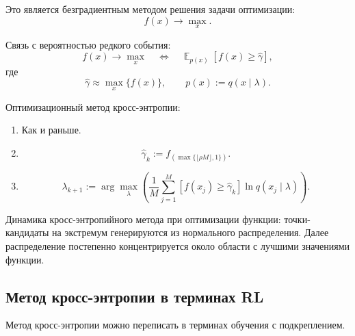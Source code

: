 \documentclass[12pt,a4paper]{article}
\DeclareMathOperator{\E}{\mathbb E}
\begin{document}
Это является безградиентным методом решения задачи оптимизации:
\[
f(x) \to \max_x.
\]

Связь с вероятностью редкого события:
\[
f(x) \to \max_x
\quad
\Longleftrightarrow
\quad
\E_{p(x)}
\left[
f(x) \ge \hat\gamma
\right],
\]
где
\[
\hat\gamma \approx \max_x \{f(x)\},
\qquad
p(x) := q(x \mid \lambda).
\]

Оптимизационный метод кросс-энтропии:

\begin{enumerate}
    \item[1)--3)] Как и раньше.

    \item[4)]
    \[
    \hat\gamma_k
    :=
    f_{(\max\{\lfloor \rho M \rfloor,1\})}.
    \]

    \item[5)]
    \[
    \lambda_{k+1}
    :=
    \arg\max_{\lambda}
    \left(
    \frac{1}{M}
    \sum_{j=1}^{M}
    \left[
    f(x_j) \ge \hat\gamma_k
    \right]
    \ln q(x_j \mid \lambda)
    \right).
    \]
\end{enumerate}

Динамика кросс-энтропийного метода при оптимизации функции: точки-кандидаты на экстремум генерируются из нормального распределения. Далее распределение постепенно концентрируется около области с лучшими значениями функции.

\subsection{Метод кросс-энтропии в терминах RL}

Метод кросс-энтропии можно переписать в терминах обучения с подкреплением.
\end{document}
